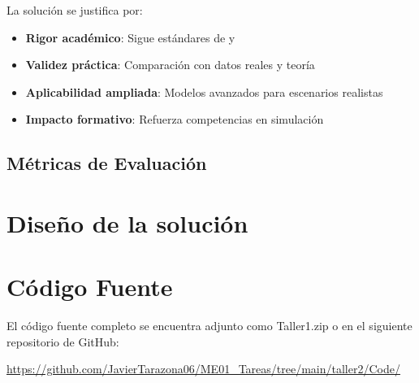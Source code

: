 \documentclass{article}
\begin{document}
La solución se justifica por:
\begin{itemize}
    \item \textbf{Rigor académico}: Sigue estándares de \cite{Law2014} y \cite{Ortiz2023}
    \item \textbf{Validez práctica}: Comparación con datos reales y teoría
    \item \textbf{Aplicabilidad ampliada}: Modelos avanzados para escenarios realistas
    \item \textbf{Impacto formativo}: Refuerza competencias en simulación
\end{itemize}

\subsection{Métricas de Evaluación}




\section{Diseño de la solución}\label{sec:disSol}



\section{Código Fuente}\label{sec:cod}

El código fuente completo se encuentra adjunto como Taller1.zip
o en el siguiente repositorio de GitHub:

\begin{center}
\url{https://github.com/JavierTarazona06/ME01_Tareas/tree/main/taller2/Code/}
\end{center}


\end{document}

